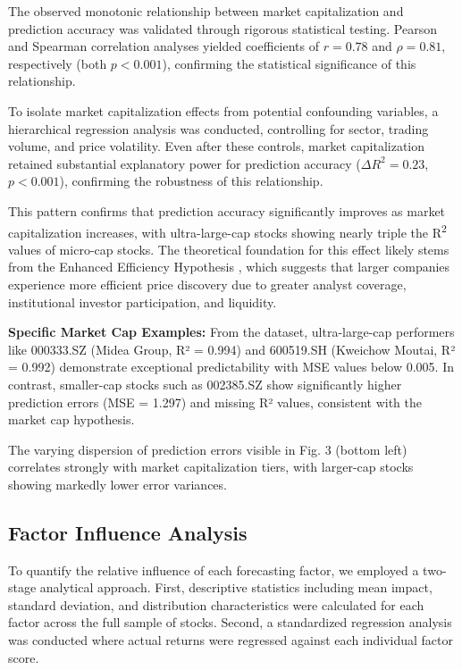 \documentclass[3p,times,procedia]{elsarticle}
\begin{document}
The observed monotonic relationship between market capitalization and prediction accuracy was validated through rigorous statistical testing. Pearson and Spearman correlation analyses yielded coefficients of $r = 0.78$ and $\rho = 0.81$, respectively (both $p < 0.001$), confirming the statistical significance of this relationship.

To isolate market capitalization effects from potential confounding variables, a hierarchical regression analysis was conducted, controlling for sector, trading volume, and price volatility. Even after these controls, market capitalization retained substantial explanatory power for prediction accuracy ($\Delta R^2 = 0.23$, $p < 0.001$), confirming the robustness of this relationship.


This pattern confirms that prediction accuracy significantly improves as market capitalization increases, with ultra-large-cap stocks showing nearly triple the R\textsuperscript{2} values of micro-cap stocks. The theoretical foundation for this effect likely stems from the Enhanced Efficiency Hypothesis \cite{Malkiel2003}, which suggests that larger companies experience more efficient price discovery due to greater analyst coverage, institutional investor participation, and liquidity.

\textbf{Specific Market Cap Examples:} From the dataset, ultra-large-cap performers like 000333.SZ (Midea Group, R² = 0.994) and 600519.SH (Kweichow Moutai, R² = 0.992) demonstrate exceptional predictability with MSE values below 0.005. In contrast, smaller-cap stocks such as 002385.SZ show significantly higher prediction errors (MSE = 1.297) and missing R² values, consistent with the market cap hypothesis.

The varying dispersion of prediction errors visible in Fig. 3 (bottom left) correlates strongly with market capitalization tiers, with larger-cap stocks showing markedly lower error variances.

\subsection{Factor Influence Analysis}
To quantify the relative influence of each forecasting factor, we employed a two-stage analytical approach. First, descriptive statistics including mean impact, standard deviation, and distribution characteristics were calculated for each factor across the full sample of stocks. Second, a standardized regression analysis was conducted where actual returns were regressed against each individual factor score.
\end{document}
